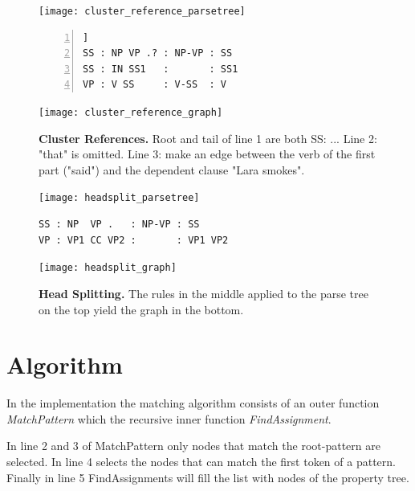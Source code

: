 \documentclass[english]{article}
\begin{document}
\begin{landscape}
\centering
\begin{minipage}{0.45\linewidth}%
  \centering
  \begin{figure}[H]
  \centering
  \texttt{[image: cluster\_reference\_parsetree]}
  \begin{lstlisting}[frame=tb, numbers=left, keepspaces=true, xleftmargin=.1\textwidth, xrightmargin=.1\textwidth]]
SS : NP VP .? : NP-VP : SS
SS : IN SS1   :       : SS1
VP : V SS     : V-SS  : V\end{lstlisting}
  \texttt{[image: cluster\_reference\_graph]}
  \caption{\textbf{Cluster References.} Root and tail of line 1 are both SS: ... Line 2: "that" is omitted. Line 3: make an edge between the verb of the first part ("said") and the dependent clause "Lara smokes". }
  \label{fig:cluster-ref}
  \end{figure}
\end{minipage}%
\hspace{0.05\linewidth}
\begin{minipage}{0.45\linewidth}%
  \centering
  \begin{figure}[H]
  \centering
  \texttt{[image: headsplit\_parsetree]}
  \begin{lstlisting}[frame=tb, keepspaces=true, xleftmargin=.01\textwidth, xrightmargin=.01\textwidth] 
SS : NP  VP .   : NP-VP : SS
VP : VP1 CC VP2 :       : VP1 VP2\end{lstlisting}
  \texttt{[image: headsplit\_graph]}
  \caption{\textbf{Head Splitting.} The rules in the middle applied to the parse tree on the top yield the graph in the bottom.}
  \label{fig:head-splitting}
  \end{figure}
\end{minipage}
\end{landscape}

\section{Algorithm}

In the implementation the matching algorithm consists of an outer function \textit{MatchPattern} which the recursive inner function \textit{FindAssignment}.

In line 2 and 3 of MatchPattern only nodes that match the root-pattern are selected. In line 4 selects the nodes that can match the first token of a pattern. Finally in line 5 FindAssignments will fill the list with nodes of the property tree.
\begin{algorithm}
\SetAlgoLined
{}
\Fn{\MatchPattern(\root, \head, \pattern)}
{


}
\end{algorithm}
\end{document}
